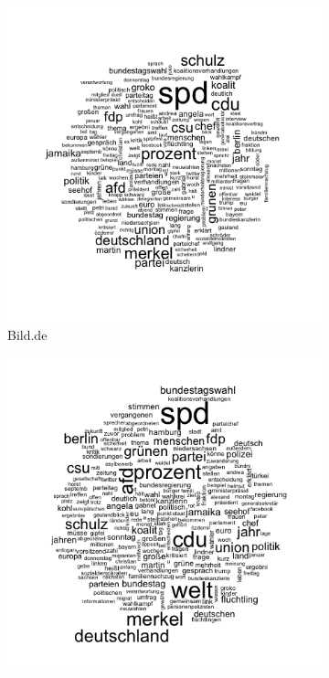 \documentclass[12pt,a4paper,notitlepage]{article}
\begin{document}
\begin{figure}[H]
	\caption{Word Clouds}
	\begin{center}
		\begin{subfigure}[normla]{0.3\textwidth}
			\includegraphics[width=\textwidth]{../figs/wordcloud_Bild.png}
			\caption{Bild.de}
		\end{subfigure}
		\begin{subfigure}[normla]{0.3\textwidth}
			\includegraphics[width=\textwidth]{../figs/wordcloud_DIEWELT.png}

\end{subfigure}
\end{center}
\end{figure}
\end{document}
